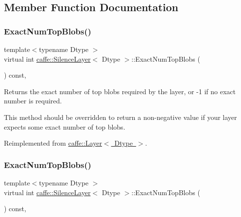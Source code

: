 \subsection{Member Function Documentation}
\mbox{\label{classcaffe_1_1_silence_layer_a1e072cbda98dbc57001ce92432b045b8}} 
\subsubsection{\texorpdfstring{Exact\+Num\+Top\+Blobs()}{ExactNumTopBlobs()}\hspace{0.1cm}{\footnotesize\ttfamily [1/2]}}
{\footnotesize\ttfamily template$<$typename Dtype $>$ \\
virtual int \mbox{\hyperlink{classcaffe_1_1_silence_layer}{caffe\+::\+Silence\+Layer}}$<$ Dtype $>$\+::Exact\+Num\+Top\+Blobs (\begin{DoxyParamCaption}{ }\end{DoxyParamCaption}) const\hspace{0.3cm}{\ttfamily [inline]}, {\ttfamily [virtual]}}



Returns the exact number of top blobs required by the layer, or -\/1 if no exact number is required. 

This method should be overridden to return a non-\/negative value if your layer expects some exact number of top blobs. 

Reimplemented from \mbox{\hyperlink{classcaffe_1_1_layer_a64e2ca72c719e4b2f1f9216ccfb0d37f}{caffe\+::\+Layer$<$ Dtype $>$}}.

\mbox{\label{classcaffe_1_1_silence_layer_a1e072cbda98dbc57001ce92432b045b8}} 
\subsubsection{\texorpdfstring{Exact\+Num\+Top\+Blobs()}{ExactNumTopBlobs()}\hspace{0.1cm}{\footnotesize\ttfamily [2/2]}}
{\footnotesize\ttfamily template$<$typename Dtype $>$ \\
virtual int \mbox{\hyperlink{classcaffe_1_1_silence_layer}{caffe\+::\+Silence\+Layer}}$<$ Dtype $>$\+::Exact\+Num\+Top\+Blobs (\begin{DoxyParamCaption}{ }\end{DoxyParamCaption}) const\hspace{0.3cm}{\ttfamily [inline]}, {\ttfamily [virtual]}}




